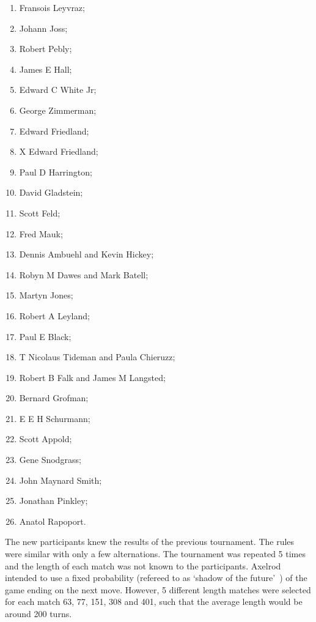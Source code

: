 \documentclass{article}
\theoremstyle{definition}
\begin{document}
\begin{multicols}{3}
\begin{enumerate}
        \item Fransois Leyvraz;
        \item Johann Joss;
        \item Robert Pebly;
        \item James E Hall;
        \item Edward C White Jr;
        \item George Zimmerman;
        \item Edward Friedland;
        \item X	Edward Friedland;
        \item Paul D Harrington;
        \item David Gladstein;
        \item Scott Feld;
        \item Fred Mauk;
        \item Dennis Ambuehl and Kevin Hickey;
        \item Robyn M Dawes and Mark Batell;
        \item Martyn Jones;
        \item Robert A Leyland;
        \item Paul E Black;
        \item T Nicolaus Tideman and Paula Chieruzz;
        \item Robert B Falk and James M Langsted;
        \item Bernard Grofman;
        \item E E H Schurmann;
        \item Scott Appold;
        \item Gene Snodgrass;
        \item John Maynard Smith;
        \item Jonathan Pinkley;
        \item Anatol Rapoport.
    \end{enumerate}
\end{multicols}

The new participants knew the results of the previous tournament. The rules
were similar with only a few alternations. The tournament was repeated 5 times
and the length of each match was not known to the participants. Axelrod intended
to use a fixed probability (refereed to as `shadow of the future'~\cite{Axelrod1988})
of the game ending on the next move. However, 5 different length matches were
selected for each match 63, 77, 151, 308 and 401, such that the average length
would be around 200 turns.
\end{document}
